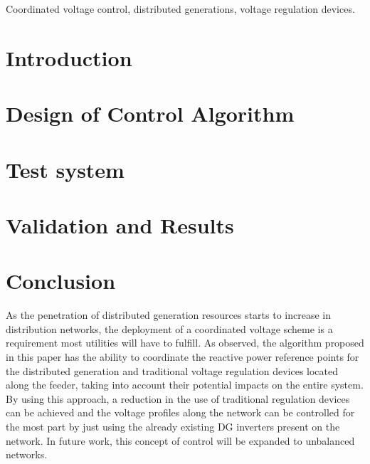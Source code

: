 \documentclass[conference]{IEEEtran}
\begin{document}
\begin{IEEEkeywords}
Coordinated voltage control, distributed generations, voltage regulation devices.
\end{IEEEkeywords}

\section{Introduction}\label{sec:intro}


\section{Design of Control Algorithm}\label{sec:design}


\section{Test system}


\section{Validation and Results}\label{sec:val}


%

\section{Conclusion}
As the penetration of distributed generation resources starts to increase in distribution networks, the deployment of a coordinated voltage scheme is a requirement most utilities will have to fulfill. As observed, the algorithm proposed in this paper has the ability to coordinate the reactive power reference points for the distributed generation and traditional voltage regulation devices located along the feeder, taking into account their potential impacts on the entire system. By using this approach, a reduction in the use of traditional regulation devices can be achieved and the voltage profiles along the network can be controlled for the most part by just using the already existing DG inverters present on the network. In future work, this concept of control will be expanded to unbalanced networks.






\end{document}
